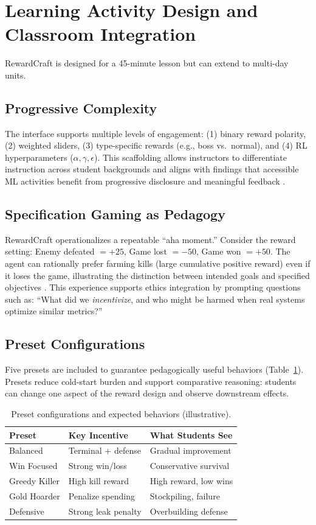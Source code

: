 \documentclass[conference]{IEEEtran}
\begin{document}
\section{Learning Activity Design and Classroom Integration}
RewardCraft is designed for a 45-minute lesson but can extend to multi-day units.

\subsection{Progressive Complexity}
The interface supports multiple levels of engagement:
(1) binary reward polarity, (2) weighted sliders, (3) type-specific rewards (e.g., boss vs.\ normal), and (4) RL hyperparameters ($\alpha,\gamma,\epsilon$).
This scaffolding allows instructors to differentiate instruction across student backgrounds and aligns with findings that accessible ML activities benefit from progressive disclosure and meaningful feedback \cite{carney2020,druga2021}.

\subsection{Specification Gaming as Pedagogy}
RewardCraft operationalizes a repeatable “aha moment.” Consider the reward setting:
Enemy defeated $= +25$, Game lost $= -50$, Game won $= +50$.
The agent can rationally prefer farming kills (large cumulative positive reward) even if it loses the game, illustrating the distinction between intended goals and specified objectives \cite{krakovna2020}. This experience supports ethics integration by prompting questions such as:
“What did we \emph{incentivize}, and who might be harmed when real systems optimize similar metrics?”

\subsection{Preset Configurations}
Five presets are included to guarantee pedagogically useful behaviors (Table~\ref{tab:presets}). Presets reduce cold-start burden and support comparative reasoning: students can change one aspect of the reward design and observe downstream effects.

\begin{table}[t]
\caption{Preset configurations and expected behaviors (illustrative).}
\label{tab:presets}
\centering
\begin{tabular}{@{}lll@{}}
\toprule
\textbf{Preset} & \textbf{Key Incentive} & \textbf{What Students See} \\
\midrule
Balanced & Terminal + defense & Gradual improvement \\
Win Focused & Strong win/loss & Conservative survival \\
Greedy Killer & High kill reward & High reward, low wins \\
Gold Hoarder & Penalize spending & Stockpiling, failure \\
Defensive & Strong leak penalty & Overbuilding defense \\
\bottomrule
\end{tabular}
\end{table}
\end{document}
